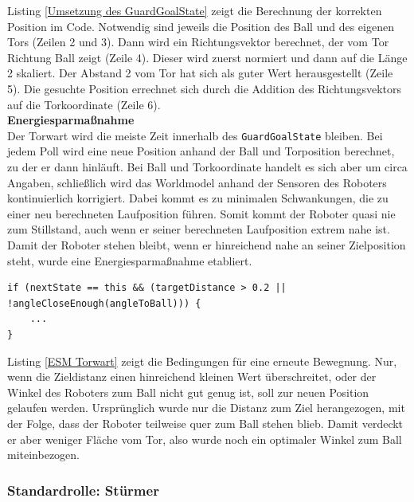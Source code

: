 \documentclass[fontsize=12pt,a4paper,final]{scrartcl}[2003/01/01]
\begin{document}
Listing \ref{Umsetzung des GuardGoalState} zeigt die Berechnung der korrekten Position im Code. Notwendig sind jeweils die Position des Ball und des eigenen Tors (Zeilen 2 und 3). Dann wird ein Richtungsvektor berechnet, der vom Tor Richtung Ball zeigt (Zeile 4). Dieser wird zuerst normiert und dann auf die Länge 2 skaliert. Der Abstand 2 vom Tor hat sich als guter Wert herausgestellt (Zeile 5). Die gesuchte Position errechnet sich durch die Addition des Richtungsvektors auf die Torkoordinate (Zeile 6).
\\

\textbf{Energiesparmaßnahme}
\\
Der Torwart wird die meiste Zeit innerhalb des \lstinline$GuardGoalState$ bleiben. Bei jedem Poll wird eine neue Position anhand der Ball und Torposition berechnet, zu der er dann hinläuft. Bei Ball und Torkoordinate handelt es sich aber um circa Angaben, schließlich wird das Worldmodel anhand der Sensoren des Roboters kontinuierlich korrigiert. Dabei kommt es zu minimalen Schwankungen, die zu einer neu berechneten Laufposition führen. Somit kommt der Roboter quasi nie zum Stillstand, auch wenn er seiner berechneten Laufposition extrem nahe ist. Damit der Roboter stehen bleibt, wenn er hinreichend nahe an seiner Zielposition steht, wurde eine Energiesparmaßnahme etabliert.
\\

\begin{lstlisting}[caption=Energiesparmaßnahme Torwart, captionpos=b, label= ESM Torwart]
if (nextState == this && (targetDistance > 0.2 || !angleCloseEnough(angleToBall))) {
	...
} 

\end{lstlisting}

Listing \ref{ESM Torwart} zeigt die Bedingungen für eine erneute Bewegnung. Nur, wenn die Zieldistanz einen hinreichend kleinen Wert überschreitet, oder der Winkel des Roboters zum Ball nicht gut genug ist, soll zur neuen Position gelaufen werden. Ursprünglich wurde nur die Distanz zum Ziel herangezogen, mit der Folge, dass der Roboter teilweise quer zum Ball stehen blieb. Damit verdeckt er aber weniger Fläche vom Tor, also wurde noch ein optimaler Winkel zum Ball miteinbezogen.
\subsubsection{Standardrolle: Stürmer}
\end{document}
